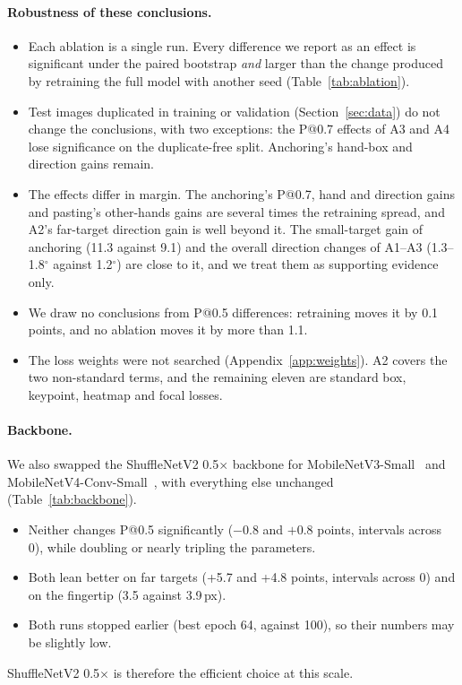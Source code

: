 \paragraph{Robustness of these conclusions.}
\begin{itemize}
\item Each ablation is a single run. Every difference we report as an effect is significant under the paired bootstrap \emph{and} larger than the change produced by retraining the full model with another seed (Table~\ref{tab:ablation}).
\item Test images duplicated in training or validation (Section~\ref{sec:data}) do not change the conclusions, with two exceptions: the P@0.7 effects of A3 and A4 lose significance on the duplicate-free split. Anchoring's hand-box and direction gains remain.
\item The effects differ in margin. The anchoring's P@0.7, hand and direction gains and pasting's other-hands gains are several times the retraining spread, and A2's far-target direction gain is well beyond it. The small-target gain of anchoring (11.3 against 9.1) and the overall direction changes of A1--A3 (1.3--1.8$^\circ$ against 1.2$^\circ$) are close to it, and we treat them as supporting evidence only.
\item We draw no conclusions from P@0.5 differences: retraining moves it by 0.1 points, and no ablation moves it by more than 1.1.
\item The loss weights were not searched (Appendix~\ref{app:weights}). A2 covers the two non-standard terms, and the remaining eleven are standard box, keypoint, heatmap and focal losses.
\end{itemize}

\paragraph{Backbone.} We also swapped the ShuffleNetV2 0.5$\times$ backbone for MobileNetV3-Small~\cite{howard2019mobilenetv3} and MobileNetV4-Conv-Small~\cite{qin2024mobilenetv4}, with everything else unchanged (Table~\ref{tab:backbone}).
\begin{itemize}
\item Neither changes P@0.5 significantly ($-$0.8 and $+$0.8 points, intervals across 0), while doubling or nearly tripling the parameters.
\item Both lean better on far targets (+5.7 and +4.8 points, intervals across 0) and on the fingertip (3.5 against 3.9\,px).
\item Both runs stopped earlier (best epoch 64, against 100), so their numbers may be slightly low.
\end{itemize}
ShuffleNetV2 0.5$\times$ is therefore the efficient choice at this scale.

